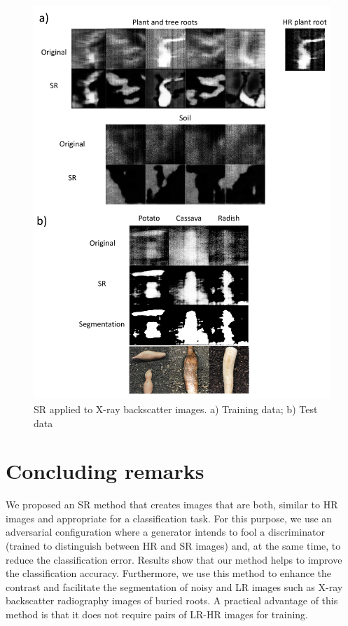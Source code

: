 \documentclass[10pt,twocolumn,letterpaper]{article}
\begin{document}
\begin{figure}[h]
\begin{center}
\includegraphics[scale=0.70]{results/srxray.pdf}
\end{center}
   \caption{SR applied to X-ray backscatter images. a) Training data; b) Test data}
\label{fig:srtest}
\end{figure}

\section{Concluding remarks}
\label{sec:conclusion}

We proposed an SR method that creates images that are both, similar to HR images and appropriate for a classification task. For this purpose, we use an adversarial configuration where a generator intends to fool a discriminator (trained to distinguish between HR and SR images) and, at the same time, to reduce the classification error. Results show that our method helps to improve the classification accuracy. Furthermore, we use this method to enhance the contrast and facilitate the segmentation of noisy and LR images such as X-ray backscatter radiography images of buried roots. A practical advantage of this method is that it does not require pairs of LR-HR images for training.
\end{document}
